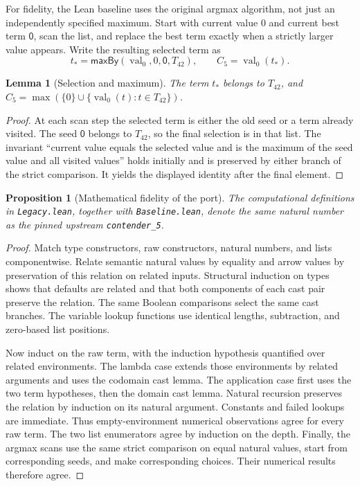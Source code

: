 \documentclass[11pt]{article}
\newtheorem{lemma}[theorem]{Lemma}
\newtheorem{proposition}[theorem]{Proposition}
\theoremstyle{definition}
\newcommand{\val}{\operatorname{val}}
\newcommand{\Cfive}{C_5}
\newcommand{\code}[1]{\texttt{#1}}
\begin{document}
For fidelity, the Lean baseline uses the original argmax algorithm, not just
an independently specified maximum. Start with current value 0 and current
best term $\mathsf0$, scan the list, and replace the best term exactly when a
strictly larger value appears. Write the resulting selected term as
\[
 t_* = \mathsf{maxBy}(\val_0,0,\mathsf0,T_{42}),\qquad
 \Cfive=\val_0(t_*).
\]

\begin{lemma}[Selection and maximum]\label{lem:selection}
The term $t_*$ belongs to $T_{42}$, and
$\Cfive=\max(\{0\}\cup\{\val_0(t):t\in T_{42}\})$.
\end{lemma}
\begin{proof}
At each scan step the selected term is either the old seed or a term already
visited. The seed $\mathsf0$ belongs to $T_{42}$, so the final selection is in
that list. The invariant ``current value equals the selected value and is the
maximum of the seed value and all visited values'' holds initially and is
preserved by either branch of the strict comparison. It yields the displayed
identity after the final element.
\end{proof}

\begin{proposition}[Mathematical fidelity of the port]\label{prop:port}
The computational definitions in \code{Legacy.lean}, together with
\code{Baseline.lean}, denote the same natural number as the pinned upstream
\code{contender\_5}.
\end{proposition}
\begin{proof}
Match type constructors, raw constructors, natural numbers, and lists
componentwise. Relate semantic natural values by equality and arrow values
by preservation of this relation on related inputs. Structural induction on
types shows that defaults are related and that both components of each cast
pair preserve the relation. The same Boolean comparisons select the same
cast branches. The variable lookup functions use identical lengths,
subtraction, and zero-based list positions.

Now induct on the raw term, with the induction hypothesis quantified over
related environments. The lambda case extends those environments by related
arguments and uses the codomain cast lemma. The application case first uses
the two term hypotheses, then the domain cast lemma. Natural recursion
preserves the relation by induction on its natural argument. Constants and
failed lookups are immediate. Thus empty-environment numerical observations
agree for every raw term. The two list enumerators agree by induction on the
depth. Finally, the argmax scans use the same strict comparison on equal
natural values, start from corresponding seeds, and make corresponding
choices. Their numerical results therefore agree.
\end{proof}
\end{document}
